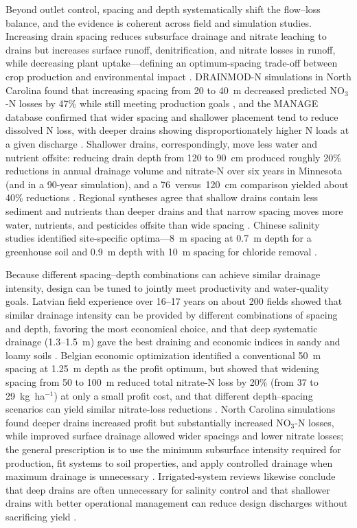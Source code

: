\documentclass[11pt]{article}
\begin{document}
Beyond outlet control, spacing and depth systematically shift the flow--loss
balance, and the evidence is coherent across field and simulation studies.
Increasing drain spacing reduces subsurface drainage and nitrate leaching to
drains but increases surface runoff, denitrification, and nitrate losses in
runoff, while decreasing plant uptake---defining an optimum-spacing trade-off
between crop production and environmental impact \parencite{ElSadek2002,ElSadek2002b}.
DRAINMOD-N simulations in North Carolina found that increasing spacing from 20
to 40~m decreased predicted NO$_3$-N losses by 47\% while still meeting
production goals \parencite{Skaggs1995}, and the MANAGE database confirmed that
wider spacing and shallower placement tend to reduce dissolved N loss, with
deeper drains showing disproportionately higher N loads at a given discharge
\parencite{Christianson2015}. Shallower drains, correspondingly, move less water
and nutrient offsite: reducing drain depth from 120 to 90~cm produced roughly
20\% reductions in annual drainage volume and nitrate-N over six years in
Minnesota (and in a 90-year simulation), and a 76~versus~120~cm comparison
yielded about 40\% reductions \parencite{Strock2011}. Regional syntheses agree
that shallow drains contain less sediment and nutrients than deeper drains and
that narrow spacing moves more water, nutrients, and pesticides offsite than
wide spacing \parencite{FAUSEY1995}. Chinese salinity studies identified
site-specific optima---8~m spacing at 0.7~m depth for a greenhouse soil
\parencite{Shao2012} and 0.9~m depth with 10~m spacing for chloride removal
\parencite{Yan2013b}.

Because different spacing--depth combinations can achieve similar drainage
intensity, design can be tuned to jointly meet productivity and water-quality
goals. Latvian field experience over 16--17 years on about 200 fields showed
that similar drainage intensity can be provided by different combinations of
spacing and depth, favoring the most economical choice, and that deep systematic
drainage (1.3--1.5~m) gave the best draining and economic indices in sandy and
loamy soils \parencite{SHKINKIS1979}. Belgian economic optimization identified a
conventional 50~m spacing at 1.25~m depth as the profit optimum, but showed that
widening spacing from 50 to 100~m reduced total nitrate-N loss by 20\% (from 37
to 29~kg~ha$^{-1}$) at only a small profit cost, and that different
depth--spacing scenarios can yield similar nitrate-loss reductions
\parencite{ElSadek2002b}. North Carolina simulations found deeper drains
increased profit but substantially increased NO$_3$-N losses, while improved
surface drainage allowed wider spacings and lower nitrate losses; the general
prescription is to use the minimum subsurface intensity required for production,
fit systems to soil properties, and apply controlled drainage when maximum
drainage is unnecessary \parencite{Breve1998}. Irrigated-system reviews likewise
conclude that deep drains are often unnecessary for salinity control and that
shallower drains with better operational management can reduce design discharges
without sacrificing yield \parencite{Ritzema2011}.
\end{document}
